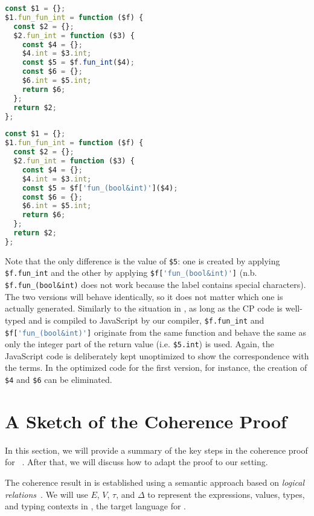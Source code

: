\noindent
\begin{minipage}{.5\textwidth}
\begin{lstlisting}[language=TypeScript]
const $1 = {};
$1.fun_fun_int = function ($f) {
  const $2 = {};
  $2.fun_int = function ($3) {
    const $4 = {};
    $4.int = $3.int;
    const $5 = $f.fun_int($4);
    const $6 = {};
    $6.int = $5.int;
    return $6;
  };
  return $2;
};
\end{lstlisting}
\end{minipage}%
\begin{minipage}{.5\textwidth}
\begin{lstlisting}[language=TypeScript]
const $1 = {};
$1.fun_fun_int = function ($f) {
  const $2 = {};
  $2.fun_int = function ($3) {
    const $4 = {};
    $4.int = $3.int;
    const $5 = $f['fun_(bool&int)']($4);
    const $6 = {};
    $6.int = $5.int;
    return $6;
  };
  return $2;
};
\end{lstlisting}
\end{minipage}

\noindent
Note that the only difference is the value of \lstinline{$5}: one is created by
applying \lstinline{$f.fun_int} and the other by applying
\lstinline[language=TypeScript]{$f['fun_(bool&int)']}
(n.b. \lstinline{$f.fun_(bool&int)} does not work because the label contains
special characters). The two versions will behave identically, so it does not
matter which one is actually generated. Similarly to the situation in \lambdar,
as long as the CP code is well-typed and is compiled to JavaScript by our
compiler, \lstinline{$f.fun_int} and
\lstinline[language=TypeScript]{$f['fun_(bool&int)']} originate from the same
function and behave the same as only the integer part of the return value  (i.e.
\lstinline{$5.int}) is used. Again, the JavaScript code is deliberately kept
unoptimized to show the correspondence with the \lambdar terms. In the optimized
code for the first version, for instance, the creation of \lstinline{$4} and
\lstinline{$6} can be eliminated.

\section{A Sketch of the Coherence Proof} \label{sec:coherence}

In this section, we will provide a summary of the key steps in the coherence
proof for \necolus~\citep{bi2018essence}. After that, we will discuss how to
adapt the proof to our setting.

The coherence result in \necolus is established using a semantic approach based
on \emph{logical relations}~\citep{tait1967intensional,biernacki2015logical}.
We will use $E$, $V$, $\tau$, and $\Delta$ to represent the expressions, values, types, and
typing contexts in \lambdac, the target language for \necolus.

